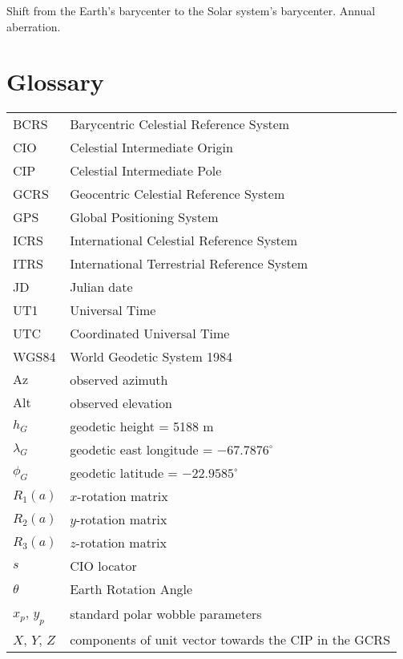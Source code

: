 \documentclass[10pt,preprint]{aastex}
\newcommand{\alt}{\mathrm{Alt}}
\newcommand{\az}{\mathrm{Az}}
\begin{document}
Shift from the Earth's barycenter to the Solar system's barycenter.
Annual aberration.


\appendix

\section{Glossary}

\begin{tabular}{ll}
BCRS & Barycentric Celestial Reference System \\
CIO & Celestial Intermediate Origin \\
CIP & Celestial Intermediate Pole \\
GCRS & Geocentric Celestial Reference System \\
GPS & Global Positioning System \\
ICRS & International Celestial Reference System \\
ITRS & International Terrestrial Reference System \\
JD & Julian date \\
UT1 & Universal Time \\
UTC & Coordinated Universal Time \\
WGS84 & World Geodetic System 1984 \\
$\az$ & observed azimuth \\
$\alt$ & observed elevation \\
$h_G$ & geodetic height = 5188 m \\
$\lambda_G$ & geodetic east longitude = $-67.7876^\circ$ \\
$\phi_G$ & geodetic latitude = $-22.9585^\circ$ \\
$R_1(a)$ & $x$-rotation matrix \\
$R_2(a)$ & $y$-rotation matrix \\
$R_3(a)$ & $z$-rotation matrix \\
$s$ & CIO locator \\
$\theta$ & Earth Rotation Angle \\
$x_p$, $y_p$ & standard polar wobble parameters \\
$X$, $Y$, $Z$ & components of unit vector towards the CIP in the GCRS
\end{tabular}
\end{document}
